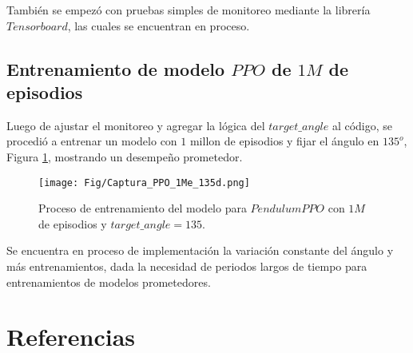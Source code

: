 \documentclass[12pt]{article}
\begin{document}
También se empezó con pruebas simples de monitoreo mediante la librería $Tensorboard$, las cuales se encuentran en proceso.

\subsection*{Entrenamiento de modelo $PPO$ de $1M$ de episodios}

Luego de ajustar el monitoreo y agregar la lógica del $target\_angle$ al código, se procedió a entrenar un modelo con $1$ millon de episodios y fijar el ángulo en $135^o$,  Figura \ref{fig:PendPPOv3}, mostrando un desempeño prometedor.

\begin{figure}[h!]
	\centering
	\texttt{[image: Fig/Captura\_PPO\_1Me\_135d.png]}
	\caption{Proceso de entrenamiento del modelo para $PendulumPPO$ con $1M$ de episodios y $target\_angle=135$.}
	\label{fig:PendPPOv3}
\end{figure}	

Se encuentra en proceso de implementación la variación constante del ángulo y más entrenamientos, dada la necesidad de periodos largos de tiempo para entrenamientos de modelos prometedores.

\newpage

\section*{Referencias}
\renewcommand\refname{}


\end{document}
